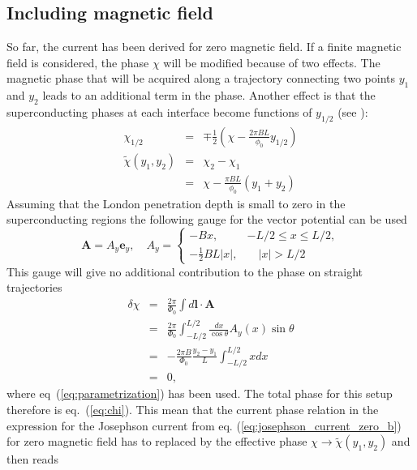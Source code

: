 \subsection*{Including magnetic field}
So far, the current has been derived for zero magnetic field. If a finite magnetic field is considered, the phase $\chi$ will be modified because of two effects. The magnetic phase that will be acquired along a trajectory connecting two points $y_1$ and $y_2$  leads to an additional term in the phase. Another effect is that the superconducting phases at each interface become functions of $y_{1/2}$ (see \cite{Meier2016}):
\begin{eqnarray}
\chi_{1/2} &=& \mp \frac{1}{2}\left( \chi - \frac{2 \pi B L }{\phi_0} y_{1/2}\right) \\
\tilde{\chi}(y_1, y_2) &=& \chi_2 - \chi_1 \\
 &=& \chi - \frac{\pi B L}{\phi_0}(y_1 + y_2)
 \label{eq:chi}
\end{eqnarray}
Assuming that the London penetration depth is small to zero in the superconducting regions the following gauge for the vector potential can be used
\begin{equation}
\mathbf{A}=A_y \mathbf{e}_y, \quad
A_y=\left\{ 
		\begin{array}{ll}
				-B x, & -L/2 \leq x \leq L/2, \\[0.2cm] 
				-\frac{1}{2} B L |x| , & \quad |x|>L/2
		\end{array} 
	\right.
\label{eq:Ay}
\end{equation}
This gauge will give no additional contribution to the phase on straight trajectories
\begin{eqnarray}
\delta \chi &=& \frac{2 \pi}{\Phi_0} \int d \mathbf{l} \cdot \mathbf{A} \\
&=& \frac{2 \pi}{\Phi_0} \int_{-L/2}^{L/2} \frac{dx}{\cos \theta} A_y (x) \sin \theta \\
&=& - \frac{2 \pi B}{\Phi_0} \frac{y_2 - y_1}{L} \int_{-L/2}^{L/2} x dx \\
&=& 0, 
\end{eqnarray}
where eq~(\ref{eq:parametrization}) has been used. The total phase for this setup therefore is eq.~(\ref{eq:chi}). This mean that the current phase relation in the expression for the Josephson current from eq. (\ref{eq:josephson_current_zero_b}) for zero magnetic field has to replaced by the effective phase $\chi \rightarrow \tilde{\chi}(y_1, y_2)$ and then reads
